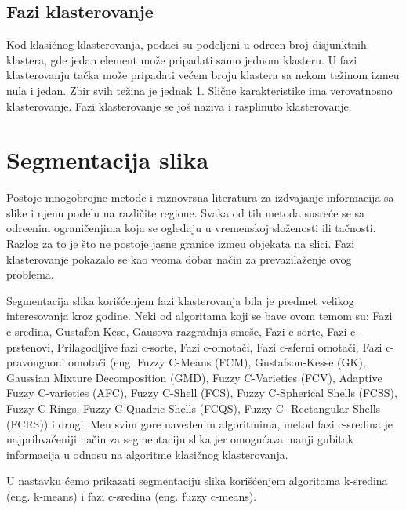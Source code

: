 \documentclass{article}
\begin{document}
\subsection{\selectfont Fazi klasterovanje}

Kod klasi\v{c}nog klasterovanja, podaci su podeljeni u odre\dj en broj disjunktnih klastera, gde jedan element mo\v{z}e pripadati samo jednom klasteru. U fazi klasterovanju ta\v{c}ka mo\v{z}e pripadati ve\'{c}em broju klastera sa nekom te\v{z}inom izme\dj u nula i jedan. Zbir svih te\v{z}ina je jednak 1. Sli\v{c}ne karakteristike ima verovatnosno klasterovanje. Fazi klasterovanje se jo\v{s} naziva i rasplinuto klasterovanje.


\section{\selectfont Segmentacija slika}

Postoje mnogobrojne metode i raznovrsna literatura za izdvajanje informacija sa slike i njenu podelu na razli\v{c}ite regione. Svaka od tih metoda susre\'{c}e se sa odre\dj enim ograni\v{c}enjima koja se ogledaju u vremenskoj slo\v{z}enosti ili ta\v{c}nosti. Razlog za to je \v{s}to ne postoje jasne granice izme\dj u objekata na slici. Fazi klasterovanje pokazalo se kao veoma dobar na\v{c}in za prevazila\v{z}enje ovog problema.

Segmentacija slika kori\v{s}\'{c}enjem fazi klasterovanja bila je predmet velikog interesovanja kroz godine. Neki od algoritama koji se bave ovom temom su: Fazi c-sredina, Gustafon-Kese, Gausova razgradnja sme\v{s}e, Fazi c-sorte, Fazi c-prstenovi,  Prilagodljive fazi c-sorte, Fazi c-omota\v{c}i, Fazi c-sferni omota\v{c}i,  Fazi c-pravougaoni omota\v{c}i (eng. {\selectfont Fuzzy C-Means (FCM), Gustafson-Kesse (GK), Gaussian Mixture Decomposition (GMD), Fuzzy C-Varieties (FCV), Adaptive Fuzzy C-varieties (AFC), Fuzzy C-Shell (FCS), Fuzzy C-Spherical Shells (FCSS), Fuzzy C-Rings, Fuzzy C-Quadric Shells (FCQS), Fuzzy C- Rectangular Shells (FCRS)}) i drugi. Me\dj u svim gore navedenim algoritmima, metod fazi c-sredina je najprihva\'{c}eniji na\v{c}in za segmentaciju slika jer omogu\'{c}ava manji gubitak informacija u odnosu na algoritme klasi\v{c}nog klasterovanja.

U nastavku \'{c}emo prikazati segmentaciju slika kori\v{s}\'{c}enjem algoritama k-sredina (eng. {\selectfont k-means}) i fazi c-sredina (eng. {\selectfont fuzzy c-means}).
\end{document}
